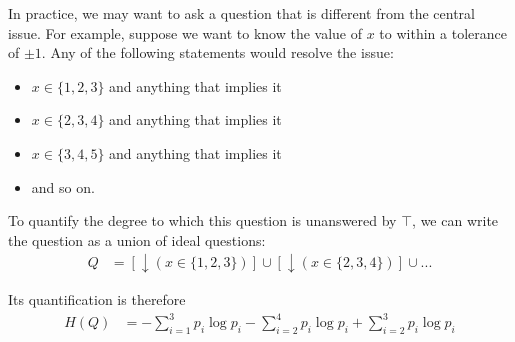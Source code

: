 \documentclass[entropy,article,accept,oneauthor,pdftex,10pt,a4paper]{mdpi}
\begin{document}
In practice, we may
want to ask a question that is different from the central issue.
For example, suppose we want to know the value of $x$ to within a tolerance
of $\pm 1$. Any of the following statements would resolve the issue:
\begin{itemize}
\item $x \in \{1, 2, 3\}$ and anything that implies it
\item $x \in \{2, 3, 4\}$ and anything that implies it
\item $x \in \{3, 4, 5\}$ and anything that implies it
\item and so on.
\end{itemize}
To quantify the degree to which this question is unanswered by
$\top$, we can write the question as a union of ideal questions:
\begin{align}
Q &= \left[\downarrow (x \in \{1, 2, 3\})\right] \cup
     \left[\downarrow (x \in \{2, 3, 4\})\right] \cup ...
\end{align}

Its quantification is therefore
\begin{align}
H(Q) &= -\sum_{i=1}^3 p_i \log p_i - \sum_{i=2}^4 p_i \log p_i
+ \sum_{i=2}^3 p_i \log p_i
\end{align}




%

\end{document}
